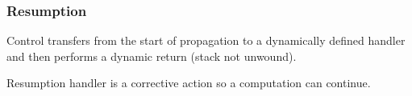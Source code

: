 \documentclass[11pt]{article}
\begin{document}
\subsubsection{Resumption}
\label{sec:orgdc67b77}
Control transfers from the start of propagation to a dynamically defined handler and then
performs a dynamic return (stack not unwound).

Resumption handler is a corrective action so a computation can continue.
\end{document}
